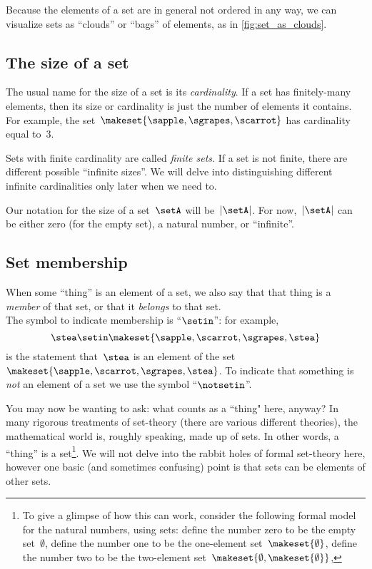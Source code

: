 Because the elements of a set are in general not ordered in any way, we can visualize sets as ``clouds'' or ``bags'' of elements, as in \cref{fig:set_as_clouds}.

\subsection{The size of a set}

The usual name for the size of a set is its \emph{cardinality}.
If a set has finitely-many elements, then its size or cardinality is just the number of elements it contains.
For example, the  set~$\makeset{ \sapple, \sgrapes, \scarrot }$ has cardinality equal to~$3$.

Sets with finite cardinality are called \emph{finite sets}.
If a set is not finite, there are different possible ``infinite sizes''.
We will delve into distinguishing different infinite cardinalities only later when we need to.

Our notation for the size of a set~$\setA$ will be~$\vert \setA \vert$.
For now,~$\vert \setA \vert$ can be either zero (for the empty set), a natural number, or ``infinite''.

\subsection{Set membership}

When some ``thing'' is an element of a set, we also say that that thing is a \emph{member} of that set, or that it \emph{belongs} to that set.
\\The symbol to indicate membership is ``$\setin$'': for example,
\begin{equation*}
    \stea \setin\makeset{ \sapple, \scarrot, \sgrapes, \stea }
\end{equation*}
is the statement that~$\stea$ is an element of the set~$\makeset{ \sapple, \scarrot, \sgrapes, \stea }$.
To indicate that something is \emph{not} an element of a set we use the symbol ``$\notsetin$''.

You may now be wanting to ask: what counts as a ``thing" here, anyway?
In many rigorous treatments of set-theory (there are various different theories), the mathematical world is, roughly speaking, made up of sets.
In other words, a ``thing'' is a set\footnote{
    To give a glimpse of how this can work, consider the following formal model for the natural numbers, using sets: define the number zero to be the empty set~$\emptyset$, define the number one to be the one-element set~$\makeset{ \emptyset }$, define the number two to be the two-element set~$\makeset{ \emptyset, \makeset{ \emptyset } }$, \etc }.
We will not delve into the rabbit holes of formal set-theory here, however one basic (and sometimes confusing) point is that sets can be elements of other sets.

